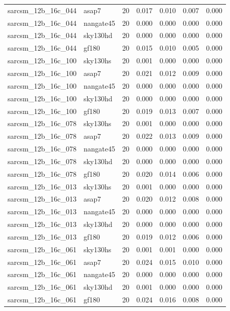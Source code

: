 \begin{tabular}{llrrrrr}
sarcsm\_12b\_16c\_044 & asap7 & 20 & 0.017 & 0.010 & 0.007 & 0.000 \\
sarcsm\_12b\_16c\_044 & nangate45 & 20 & 0.000 & 0.000 & 0.000 & 0.000 \\
sarcsm\_12b\_16c\_044 & sky130hd & 20 & 0.000 & 0.000 & 0.000 & 0.000 \\
sarcsm\_12b\_16c\_044 & gf180 & 20 & 0.015 & 0.010 & 0.005 & 0.000 \\
sarcsm\_12b\_16c\_100 & sky130hs & 20 & 0.001 & 0.000 & 0.000 & 0.000 \\
sarcsm\_12b\_16c\_100 & asap7 & 20 & 0.021 & 0.012 & 0.009 & 0.000 \\
sarcsm\_12b\_16c\_100 & nangate45 & 20 & 0.000 & 0.000 & 0.000 & 0.000 \\
sarcsm\_12b\_16c\_100 & sky130hd & 20 & 0.000 & 0.000 & 0.000 & 0.000 \\
sarcsm\_12b\_16c\_100 & gf180 & 20 & 0.019 & 0.013 & 0.007 & 0.000 \\
sarcsm\_12b\_16c\_078 & sky130hs & 20 & 0.001 & 0.000 & 0.000 & 0.000 \\
sarcsm\_12b\_16c\_078 & asap7 & 20 & 0.022 & 0.013 & 0.009 & 0.000 \\
sarcsm\_12b\_16c\_078 & nangate45 & 20 & 0.000 & 0.000 & 0.000 & 0.000 \\
sarcsm\_12b\_16c\_078 & sky130hd & 20 & 0.000 & 0.000 & 0.000 & 0.000 \\
sarcsm\_12b\_16c\_078 & gf180 & 20 & 0.020 & 0.014 & 0.006 & 0.000 \\
sarcsm\_12b\_16c\_013 & sky130hs & 20 & 0.001 & 0.000 & 0.000 & 0.000 \\
sarcsm\_12b\_16c\_013 & asap7 & 20 & 0.020 & 0.012 & 0.008 & 0.000 \\
sarcsm\_12b\_16c\_013 & nangate45 & 20 & 0.000 & 0.000 & 0.000 & 0.000 \\
sarcsm\_12b\_16c\_013 & sky130hd & 20 & 0.000 & 0.000 & 0.000 & 0.000 \\
sarcsm\_12b\_16c\_013 & gf180 & 20 & 0.019 & 0.012 & 0.006 & 0.000 \\
sarcsm\_12b\_16c\_061 & sky130hs & 20 & 0.001 & 0.001 & 0.000 & 0.000 \\
sarcsm\_12b\_16c\_061 & asap7 & 20 & 0.024 & 0.015 & 0.010 & 0.000 \\
sarcsm\_12b\_16c\_061 & nangate45 & 20 & 0.000 & 0.000 & 0.000 & 0.000 \\
sarcsm\_12b\_16c\_061 & sky130hd & 20 & 0.001 & 0.000 & 0.000 & 0.000 \\
sarcsm\_12b\_16c\_061 & gf180 & 20 & 0.024 & 0.016 & 0.008 & 0.000 \\

\end{tabular}
